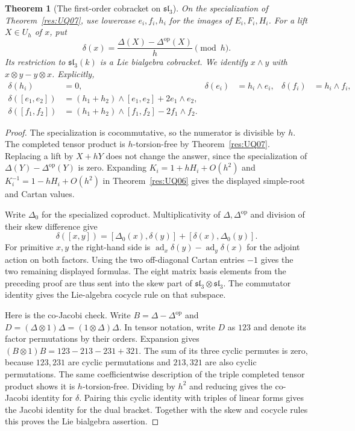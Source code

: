 \documentclass[11pt,oneside,openany]{book}
\newtheorem{theorem}{Theorem}[chapter]
\theoremstyle{definition}
\theoremstyle{remark}
\begin{document}
\begin{theorem}[The first-order cobracket on \(\mathfrak{sl}_3\)]
\label{res:UQ08}
On the specialization of Theorem~\ref{res:UQ07}, use
lowercase \(e_i,f_i,h_i\) for the images of \(E_i,F_i,H_i\).
For a lift \(X\in U_h\) of \(x\), put
\[
 \delta(x)=\frac{\Delta(X)-\Delta^{\mathrm{op}}(X)}h
             \pmod h .
\]
Its restriction to \(\mathfrak{sl}_3(k)\) is a Lie
bialgebra cobracket. We identify \(x\wedge y\) with
\(x\otimes y-y\otimes x\). Explicitly,
\[
\begin{aligned}
 \delta(h_i)&=0, &
 \delta(e_i)&=h_i\wedge e_i, &
 \delta(f_i)&=h_i\wedge f_i,\\
 \delta([e_1,e_2])&=(h_1+h_2)\wedge[e_1,e_2]+2e_1\wedge e_2,\\
 \delta([f_1,f_2])&=(h_1+h_2)\wedge[f_1,f_2]-2f_1\wedge f_2 .
\end{aligned}
\]
\end{theorem}
\begin{proof}
The specialization is cocommutative, so the numerator
is divisible by \(h\). The completed tensor product
is \(h\)-torsion-free by Theorem~\ref{res:UQ07}.
Replacing a lift by \(X+hY\) does not change the
answer, since the specialization of
\(\Delta(Y)-\Delta^{\mathrm{op}}(Y)\) is zero.
Expanding \(K_i=1+hH_i+O(h^2)\) and
\(K_i^{-1}=1-hH_i+O(h^2)\) in Theorem~\ref{res:UQ06}
gives the displayed simple-root and Cartan values.

Write \(\Delta_0\) for the specialized coproduct.
Multiplicativity of \(\Delta,\Delta^{\mathrm{op}}\)
and division of their skew difference give
\[
 \delta([x,y])=[\Delta_0(x),\delta(y)]
                  +[\delta(x),\Delta_0(y)] .
\]
For primitive \(x,y\) the right-hand side is
\(\operatorname{ad}_x\delta(y)-\operatorname{ad}_y\delta(x)\)
for the adjoint action on both factors. Using the
two off-diagonal Cartan entries \(-1\) gives
the two remaining displayed formulas. The eight
matrix basis elements from the preceding proof are thus
sent into the skew part of \(\mathfrak{sl}_3\otimes\mathfrak{sl}_3\).
The commutator identity gives the Lie-algebra cocycle rule
on that subspace.

Here is the co-Jacobi check. Write \(B=\Delta-\Delta^{\mathrm{op}}\)
and \(D=(\Delta\otimes1)\Delta=(1\otimes\Delta)\Delta\).
In tensor notation, write \(D\) as \(123\) and denote
its factor permutations by their orders. Expansion gives
\((B\otimes1)B=123-213-231+321\).
The sum of its three cyclic permutes is zero, because
\(123,231\) are cyclic permutations and \(213,321\) are
also cyclic permutations. The same coefficientwise
description of the triple completed tensor product
shows it is \(h\)-torsion-free. Dividing by \(h^2\)
and reducing gives the co-Jacobi identity for \(\delta\).
Pairing this cyclic identity with triples of linear forms
gives the Jacobi identity for the dual bracket. Together
with the skew and cocycle rules this proves the Lie
bialgebra assertion.
\end{proof}
\end{document}
